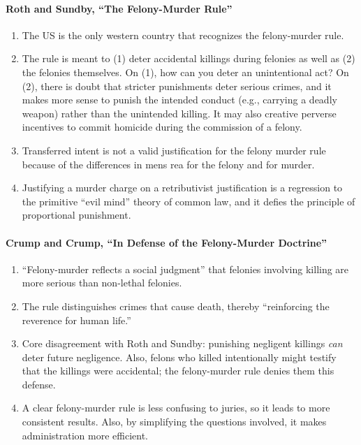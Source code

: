 \paragraph{Roth and Sundby, ``The Felony-Murder Rule''}

\begin{enumerate}
    \item The US is the only western country that recognizes the felony-murder 
    rule.
    \item The rule is meant to (1) deter accidental killings during felonies 
    as well as (2) the felonies themselves. On (1), how can you deter an 
    unintentional act? On (2), there is doubt that stricter punishments deter 
    serious crimes, and it makes more sense to punish the intended conduct 
    (e.g., carrying a deadly weapon) rather than the unintended killing. It 
    may also creative perverse incentives to commit homicide during the 
    commission of a felony.
    \item Transferred intent is not a valid justification for the felony 
    murder rule because of the differences in mens rea for the felony 
    and for murder.
    \item Justifying a murder charge on a retributivist justification is a 
    regression to the primitive ``evil mind'' theory of common law, and it 
    defies the principle of proportional punishment.
\end{enumerate}

\paragraph{Crump and Crump, ``In Defense of the Felony-Murder Doctrine''}

\begin{enumerate}
    \item ``Felony-murder reflects a social judgment'' that felonies involving 
    killing are more serious than non-lethal felonies.
    \item The rule distinguishes crimes that cause death, thereby 
    ``reinforcing the reverence for human life.''
    \item Core disagreement with Roth and Sundby: punishing negligent killings 
    \emph{can} deter future negligence. Also, felons who killed intentionally 
    might testify that the killings were accidental; the felony-murder rule 
    denies them this defense.
    \item A clear felony-murder rule is less confusing to juries, so it leads 
    to more consistent results. Also, by simplifying the questions involved, 
    it makes administration more efficient.
\end{enumerate}

